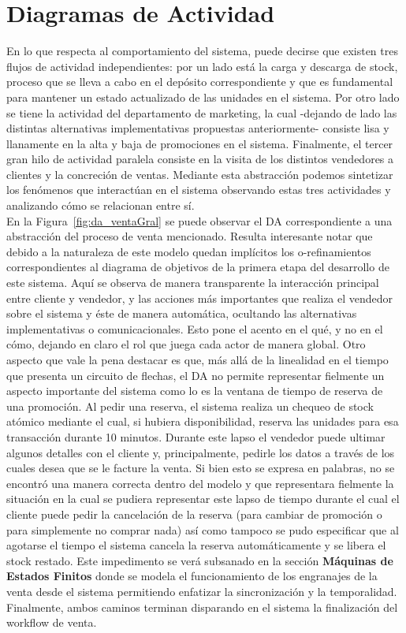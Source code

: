 \section{Diagramas de Actividad}

En lo que respecta al comportamiento del sistema, puede decirse que existen tres flujos de actividad independientes: por un lado está la carga y descarga de stock, proceso que se lleva a cabo en el depósito correspondiente y que es fundamental para mantener un estado actualizado de las unidades en el sistema. Por otro lado se tiene la actividad del departamento de marketing, la cual -dejando de lado las distintas alternativas implementativas propuestas anteriormente- consiste lisa y llanamente en la alta y baja de promociones en el sistema. Finalmente, el tercer gran hilo de actividad paralela consiste en la visita de los distintos vendedores a clientes y la concreción de ventas. Mediante esta abstracción podemos sintetizar los fenómenos que interactúan en el sistema observando estas tres actividades y analizando cómo se relacionan entre sí.\\
\indent En la Figura~\ref{fig:da_ventaGral} se puede observar el DA correspondiente a una abstracción del proceso de venta mencionado. Resulta interesante notar que debido a la naturaleza de este modelo quedan implícitos los o-refinamientos correspondientes al diagrama de objetivos de la primera etapa del desarrollo de este sistema. Aquí se observa de manera transparente la interacción principal entre cliente y vendedor, y las acciones más importantes que realiza el vendedor sobre el sistema y éste de manera automática, ocultando las alternativas implementativas o comunicacionales. Esto pone el acento en el qué, y no en el cómo, dejando en claro el rol que juega cada actor de manera global. Otro aspecto que vale la pena destacar es que, más allá de la linealidad en el tiempo que presenta un circuito de flechas, el DA no permite representar fielmente un aspecto importante del sistema como lo es la ventana de tiempo de reserva de una promoción. Al pedir una reserva, el sistema realiza un chequeo de stock atómico mediante el cual, si hubiera disponibilidad, reserva las unidades para esa transacción durante 10 minutos. Durante este lapso el vendedor puede ultimar algunos detalles con el cliente y, principalmente, pedirle los datos a través de los cuales desea que se le facture la venta. Si bien esto se expresa en palabras, no se encontró una manera correcta dentro del modelo y que representara fielmente la situación en la cual se pudiera representar este lapso de tiempo durante el cual el cliente puede pedir la cancelación de la reserva (para cambiar de promoción o para simplemente no comprar nada) así como tampoco se pudo especificar que al agotarse el tiempo el sistema cancela la reserva automáticamente y se libera el stock restado. Este impedimento se verá subsanado en la sección \textbf{Máquinas de Estados Finitos} donde se modela el funcionamiento de los engranajes de la venta desde el sistema permitiendo enfatizar la sincronización y la temporalidad. Finalmente, ambos caminos terminan disparando en el sistema la finalización del workflow de venta.\\
